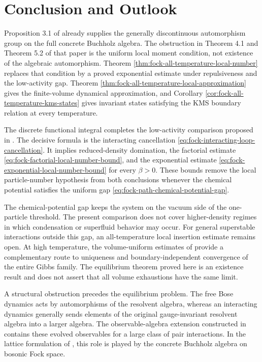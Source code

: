 \documentclass[11pt,a4paper]{article}
\theoremstyle{plain}
\theoremstyle{definition}
\theoremstyle{remark}
\begin{document}
\section{Conclusion and Outlook}\label{conclusion-and-outlook}

Proposition 3.1 of \cite{DeuchertLampartLemm001} already supplies the generally discontinuous automorphism group on the full concrete Buchholz algebra. The obstruction in Theorem 4.1 and Theorem 5.2 of that paper is the uniform local moment condition, not existence of the algebraic automorphism. Theorem \ref{thm:fock-all-temperature-local-number} replaces that condition by a proved exponential estimate under repulsiveness and the low-activity gap. Theorem \ref{thm:fock-all-temperature-local-approximation} gives the finite-volume dynamical approximation, and Corollary \ref{cor:fock-all-temperature-kms-states} gives invariant states satisfying the KMS boundary relation at every temperature.

The discrete functional integral completes the low-activity comparison proposed in \cite[Remark 5.3]{DeuchertLampartLemm001}. The decisive formula is the interacting cancellation \eqref{eq:fock-interacting-loop-cancellation}. It implies reduced-density domination, the factorial estimate \eqref{eq:fock-factorial-local-number-bound}, and the exponential estimate \eqref{eq:fock-exponential-local-number-bound} for every \(\beta > 0\). These bounds remove the local particle-number hypothesis from both conclusions whenever the chemical potential satisfies the uniform gap \eqref{eq:fock-path-chemical-potential-gap}.

The chemical-potential gap keeps the system on the vacuum side of the one-particle threshold. The present comparison does not cover higher-density regimes in which condensation or superfluid behavior may occur. For general superstable interactions outside this gap, an all-temperature local insertion estimate remains open. At high temperature, the volume-uniform estimates of \cite[Theorem 1]{GongKuwaharaTong001} provide a complementary route to uniqueness and boundary-independent convergence of the entire Gibbs family. The equilibrium theorem proved here is an existence result and does not assert that all volume exhaustions have the same limit.

A structural obstruction precedes the equilibrium problem. The free Bose dynamics acts by automorphisms of the resolvent algebra, whereas an interacting dynamics generally sends elements of the original gauge-invariant resolvent algebra into a larger algebra. The observable-algebra extension constructed in \cite{DetlevBuchholz002,DetlevBuchholz003} contains these evolved observables for a large class of pair interactions. In the lattice formulation of \cite[Definition 2.2 and Proposition 3.1]{DeuchertLampartLemm001}, this role is played by the concrete Buchholz algebra on bosonic Fock space.
\end{document}
